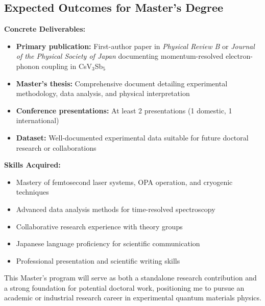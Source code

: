 \documentclass[12pt,a4paper]{article}
\begin{document}
\subsection{Expected Outcomes for Master's Degree}

\textbf{Concrete Deliverables:}
\begin{itemize}
    \item \textbf{Primary publication:} First-author paper in \textit{Physical Review B} or \textit{Journal of the Physical Society of Japan} documenting momentum-resolved electron-phonon coupling in CsV$_3$Sb$_5$
    \item \textbf{Master's thesis:} Comprehensive document detailing experimental methodology, data analysis, and physical interpretation
    \item \textbf{Conference presentations:} At least 2 presentations (1 domestic, 1 international)
    \item \textbf{Dataset:} Well-documented experimental data suitable for future doctoral research or collaborations
\end{itemize}

\textbf{Skills Acquired:}
\begin{itemize}
    \item Mastery of femtosecond laser systems, OPA operation, and cryogenic techniques
    \item Advanced data analysis methods for time-resolved spectroscopy
    \item Collaborative research experience with theory groups
    \item Japanese language proficiency for scientific communication
    \item Professional presentation and scientific writing skills
\end{itemize}

This Master's program will serve as both a standalone research contribution and a strong foundation for potential doctoral work, positioning me to pursue an academic or industrial research career in experimental quantum materials physics.

\newpage
\printbibliography
\end{document}
